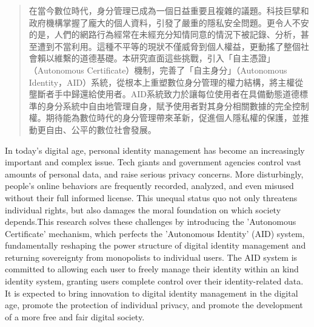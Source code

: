 
\begin{abstract}
  在當今數位時代，身分管理已成為一個日益重要且複雜的議題。科技巨擘和政府機構掌握了龐大的個人資料，引發了嚴重的隱私安全問題。更令人不安的是，人們的網路行為經常在未經充分知情同意的情況下被記錄、分析，甚至遭到不當利用。這種不平等的現狀不僅威脅到個人權益，更動搖了整個社會賴以維繫的道德基礎。本研究直面這些挑戰，引入「自主憑證」（Autonomous Certificate）機制，完善了「自主身分」（Autonomous Identity，AID）系統，從根本上重塑數位身分管理的權力結構，將主權從壟斷者手中歸還給使用者。AID系統致力於讓每位使用者在具備動態道德標準的身分系統中自由地管理自身，賦予使用者對其身分相關數據的完全控制權。期待能為數位時代的身分管理帶來革新，促進個人隱私權的保護，並推動更自由、公平的數位社會發展。
\end{abstract}

\begin{abstract*}
  In today's digital age, personal identity management has become an increasingly important and complex issue. Tech giants and government agencies control vast amounts of personal data, and raise serious privacy concerns. More disturbingly, people's online behaviors are frequently recorded, analyzed, and even misused without their full informed license. This unequal status quo not only threatens individual rights, but also damages the moral foundation on which society depends.This research solves these challenges by introducing the 'Autonomous Certificate' mechanism, which perfects the 'Autonomous Identity' (AID) system, fundamentally reshaping the power structure of digital identity management and returning sovereignty from monopolists to individual users. The AID system is committed to allowing each user to freely manage their identity within an kind identity system, granting users complete control over their identity-related data. It is expected to bring innovation to digital identity management in the digital age, promote the protection of individual privacy, and promote the development of a more free and fair digital society.
\end{abstract*}